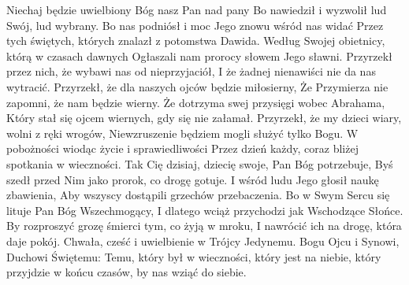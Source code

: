 \startpsalmus[title={Niechaj będzie uwielbiony (por Łk 1,68-79)}]
Niechaj będzie uwielbiony Bóg nasz Pan nad pany\pmed
Bo nawiedził i wyzwolił lud Swój, lud wybrany.\pfin
Bo nas podniósł i moc Jego znowu wśród nas widać\pmed
Przez tych świętych, których znalazł z potomstwa Dawida.\pfin
Według Swojej obietnicy, którą w czasach dawnych\pmed
Ogłaszali nam prorocy słowem Jego sławni.\pfin
Przyrzekł przez nich, że wybawi nas od nieprzyjaciół,\pmed
I że żadnej nienawiści nie da nas wytracić.\pfin
Przyrzekł, że dla naszych ojców będzie miłosierny,\pmed
Że Przymierza nie zapomni, że nam będzie wierny.\pfin
Że dotrzyma swej przysięgi wobec Abrahama,\pmed
Który stał się ojcem wiernych, gdy się nie załamał.\pfin
Przyrzekł, że my dzieci wiary, wolni z ręki wrogów,\pmed
Niewzruszenie będziem mogli służyć tylko Bogu.\pfin
W pobożności wiodąc życie i sprawiedliwości\pmed
Przez dzień każdy, coraz bliżej spotkania w wieczności.\pfin
Tak Cię dzisiaj, dziecię swoje, Pan Bóg potrzebuje,\pmed
Byś szedł przed Nim jako prorok, co drogę gotuje.\pfin
I wśród ludu Jego głosił naukę zbawienia,\pmed
Aby wszyscy dostąpili grzechów przebaczenia.\pfin
Bo w Swym Sercu się lituje Pan Bóg Wszechmogący,\pmed
I dlatego wciąż przychodzi jak Wschodzące Słońce.\pfin
By rozproszyć grozę śmierci tym, co żyją w mroku,\pmed
I nawrócić ich na drogę, która daje pokój.\pfin
Chwała, cześć i uwielbienie w Trójcy Jedynemu.\pmed
Bogu Ojcu i Synowi, Duchowi Świętemu:\pfin
Temu, który był w wieczności, który jest na niebie,\pmed
który przyjdzie w końcu czasów, by nas wziąć do siebie.\pfin
\endinput


